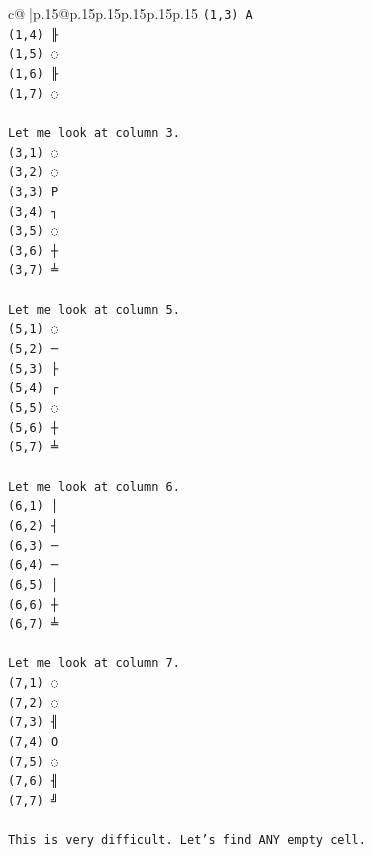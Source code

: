 \documentclass{article}
\begin{document}
{\begin{supertabular}{c@{$\;$}|p{.15\linewidth}@{}p{.15\linewidth}p{.15\linewidth}p{.15\linewidth}p{.15\linewidth}p{.15\linewidth}}
{{{\texttt{(1,3) A} \\
\texttt{(1,4) ╟} \\
\texttt{(1,5) ◌} \\
\texttt{(1,6) ╟} \\
\texttt{(1,7) ◌} \\
\\ 
\texttt{Let me look at column 3.} \\
\texttt{(3,1) ◌} \\
\texttt{(3,2) ◌} \\
\texttt{(3,3) P} \\
\texttt{(3,4) ┐} \\
\texttt{(3,5) ◌} \\
\texttt{(3,6) ┼} \\
\texttt{(3,7) ╧} \\
\\ 
\texttt{Let me look at column 5.} \\
\texttt{(5,1) ◌} \\
\texttt{(5,2) ─} \\
\texttt{(5,3) ├} \\
\texttt{(5,4) ┌} \\
\texttt{(5,5) ◌} \\
\texttt{(5,6) ┼} \\
\texttt{(5,7) ╧} \\
\\ 
\texttt{Let me look at column 6.} \\
\texttt{(6,1) │} \\
\texttt{(6,2) ┤} \\
\texttt{(6,3) ─} \\
\texttt{(6,4) ─} \\
\texttt{(6,5) │} \\
\texttt{(6,6) ┼} \\
\texttt{(6,7) ╧} \\
\\ 
\texttt{Let me look at column 7.} \\
\texttt{(7,1) ◌} \\
\texttt{(7,2) ◌} \\
\texttt{(7,3) ╢} \\
\texttt{(7,4) O} \\
\texttt{(7,5) ◌} \\
\texttt{(7,6) ╢} \\
\texttt{(7,7) ╝} \\
\\ 
\texttt{This is very difficult. Let's find ANY empty cell.} \\
}}}
\end{supertabular}}
\end{document}
